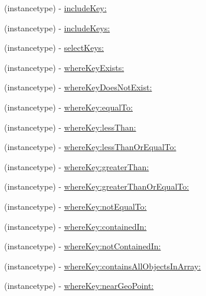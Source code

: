 \begin{DoxyCompactItemize}
\begin{DoxyCompactList}
 \end{DoxyCompactList}\item 
(instancetype) -\/ \hyperlink{class_p_f_query_abd2e3ea3e83aef4392b228f80ecedb9b}{include\+Key\+:}
\begin{DoxyCompactList}\small\item\em 

 \end{DoxyCompactList}\item 
(instancetype) -\/ \hyperlink{class_p_f_query_a1916d8c4d3bd4b58381df69d042394cb}{include\+Keys\+:}
\item 
(instancetype) -\/ \hyperlink{class_p_f_query_a0655c2dc049d3f8b7631e62fff9de562}{select\+Keys\+:}
\item 
(instancetype) -\/ \hyperlink{class_p_f_query_ac93bb5470d060c87ab1edb2a9287a6ba}{where\+Key\+Exists\+:}
\item 
(instancetype) -\/ \hyperlink{class_p_f_query_accb6619ba929837ef5fc2d5b0e1ca5d5}{where\+Key\+Does\+Not\+Exist\+:}
\item 
(instancetype) -\/ \hyperlink{class_p_f_query_a51ee07d046e5639dfddb957a99c4da55}{where\+Key\+:equal\+To\+:}
\item 
(instancetype) -\/ \hyperlink{class_p_f_query_a77417ab3fb199edd5b4b5649bf7b2097}{where\+Key\+:less\+Than\+:}
\item 
(instancetype) -\/ \hyperlink{class_p_f_query_ad71ec837cecf3de53ed638b6a8ef8b5d}{where\+Key\+:less\+Than\+Or\+Equal\+To\+:}
\item 
(instancetype) -\/ \hyperlink{class_p_f_query_ac4e8be97b6bd75e9a7c0dd0915661f3f}{where\+Key\+:greater\+Than\+:}
\item 
(instancetype) -\/ \hyperlink{class_p_f_query_a7057c8c672b23e79c430ab45cde6ccf5}{where\+Key\+:greater\+Than\+Or\+Equal\+To\+:}
\item 
(instancetype) -\/ \hyperlink{class_p_f_query_a356fff65dd8a6742e076dac97ff4f989}{where\+Key\+:not\+Equal\+To\+:}
\item 
(instancetype) -\/ \hyperlink{class_p_f_query_ae00659ed9e8de759ccbbc9782e51689b}{where\+Key\+:contained\+In\+:}
\item 
(instancetype) -\/ \hyperlink{class_p_f_query_a605c41af4961000b3f4bc84983e89a38}{where\+Key\+:not\+Contained\+In\+:}
\item 
(instancetype) -\/ \hyperlink{class_p_f_query_a3cd005764242a368f0d59e621968ae8f}{where\+Key\+:contains\+All\+Objects\+In\+Array\+:}
\item 
(instancetype) -\/ \hyperlink{class_p_f_query_ae4ce22289994f54f9da4592a9cc61e4f}{where\+Key\+:near\+Geo\+Point\+:}
\begin{DoxyCompactList}\small\item\em 


\end{DoxyCompactList}
\end{DoxyCompactItemize}
